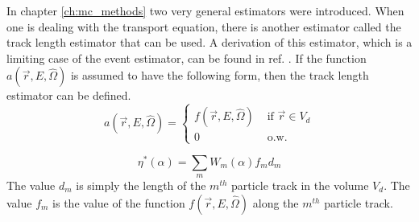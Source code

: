 In chapter \ref{ch:mc_methods} two very general estimators were introduced.
When one is dealing with the transport equation, there is another estimator 
called the track length estimator that can be used. A derivation of this 
estimator, which is a limiting case of the event estimator, can be found in ref.
\citep{spanier_monte_1969}. If the function $a(\vec{r},E,\hat{\Omega})$ is 
assumed to have the following form, then the track length estimator can be 
defined. 
\begin{equation*}
  a(\vec{r},E,\hat{\Omega}) = 
  \begin{cases}
    f(\vec{r},E,\hat{\Omega}) & \text{ if } \vec{r} \in V_d \\
    0 & \text{ o.w.}
  \end{cases}
\end{equation*}

\begin{equation}
  \eta^{*}(\alpha) = \sum_m W_m(\alpha)f_md_m
\end{equation}
The value $d_m$ is simply the length of the $m^{th}$ particle track in the 
volume $V_d$. The value $f_m$ is the value of the function 
$f(\vec{r},E,\hat{\Omega})$ along the $m^{th}$ particle track. 
